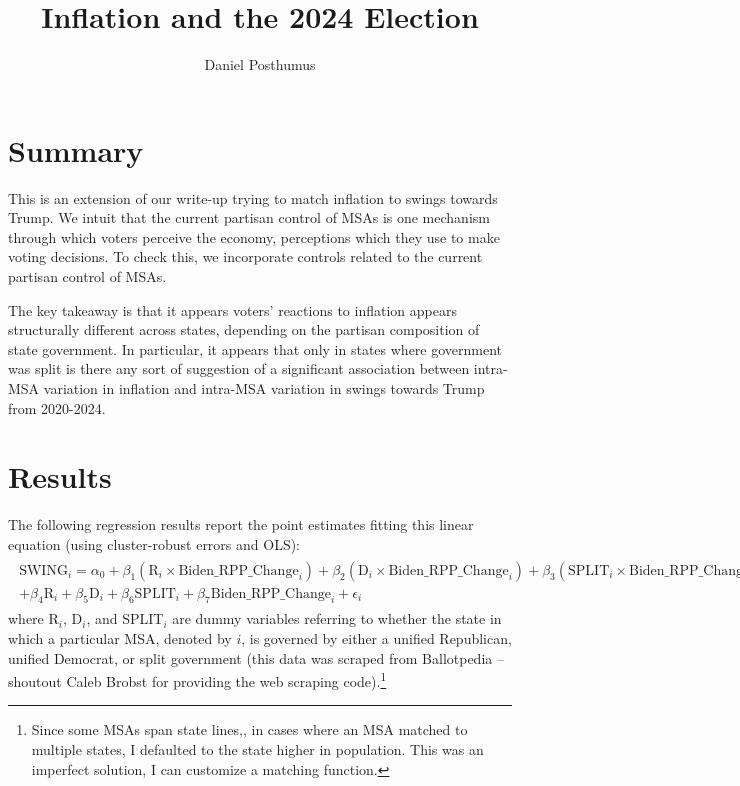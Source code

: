 \documentclass{article}
\title{Inflation and the 2024 Election}
\author{Daniel Posthumus}
\begin{document}
\maketitle 

\section{Summary}

This is an extension of our write-up trying to match inflation to swings towards Trump. We intuit that the current partisan control of MSAs is one mechanism through which voters perceive the economy, perceptions which they use to make voting decisions. To check this, we incorporate controls related to the current partisan control of MSAs. 

The key takeaway is that it appears voters' reactions to inflation appears structurally different across states, depending on the partisan composition of state government. In particular, it appears that only in states where government was split is there any sort of suggestion of a significant association between intra-MSA variation in inflation and intra-MSA variation in swings towards Trump from 2020-2024.

\section{Results}

The following regression results report the point estimates fitting this linear equation (using cluster-robust errors and OLS):
\begin{gather}
\begin{split}
	\text{SWING}_i = \alpha_0 + \beta_1 (\text{R}_i \times \text{Biden\_RPP\_Change}_i) + \beta_2 (\text{D}_i \times \text{Biden\_RPP\_Change}_i) + \beta_3 (\text{SPLIT}_i \times \text{Biden\_RPP\_Change}_i)  \\
	+ \beta_4 \text{R}_i + \beta_5 \text{D}_i + \beta_6 \text{SPLIT}_i + \beta_7 \text{Biden\_RPP\_Change}_i + \epsilon_i
\end{split}
\end{gather}
where R$_i$, D$_i$, and SPLIT$_i$ are dummy variables referring to whether the state in which a particular MSA, denoted by $i$, is governed by either a unified Republican, unified Democrat, or split government (this data was scraped from Ballotpedia -- shoutout Caleb Brobst for providing the web scraping code).\footnote{Since some MSAs span state lines,, in cases where an MSA matched to multiple states, I defaulted to the state higher in population. This was an imperfect solution, I can customize a matching function.}
\end{document}
